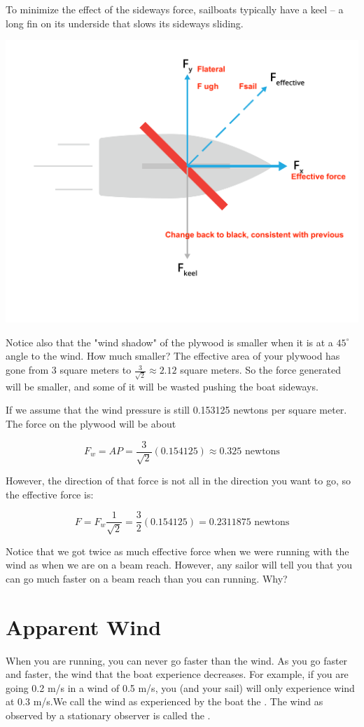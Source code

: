 To minimize the effect of the sideways force,  sailboats typically have  a keel -- a long fin on its underside that slows its sideways sliding.

\includegraphics[width=.75\textwidth]{pressure2.png}


Notice also that the "wind shadow" of the plywood is smaller when it is at a $45^\circ$ angle to the wind.  How much smaller?  The effective area of your plywood has 
gone from 3 square meters to $\frac{3}{\sqrt{2}} \approx 2.12$ square meters.   So the force generated will be smaller, and some of it will be wasted pushing the boat sideways.

If we assume that the wind pressure is still 0.153125 newtons per square meter.  The force on the plywood will be about

$$F_w = A P = \frac{3}{\sqrt{2}}(0.154125) \approx 0.325 \text{ newtons}$$

However,   the direction of that force is not all in the direction you want to go,  so the effective force is:

$$F = F_w \frac{1}{\sqrt{2}} =  \frac{3}{2}(0.154125) = 0.2311875 \text{ newtons}$$

Notice that we got twice as much effective force when we were running with the wind as when we are on a beam reach.   However,  any sailor will tell you that you can go much faster
on a beam reach than you can running.  Why?

\section{Apparent Wind}

When you are running,  you can never go faster than the wind.   As you go faster and faster,  the wind that the boat experience decreases.   For example,  if you are going 0.2 m/s in a wind 
of 0.5 m/s,  you (and your sail) will only experience wind at 0.3 m/s.We call the wind as experienced by the boat 
the .  The wind as observed by a stationary observer is called the .


